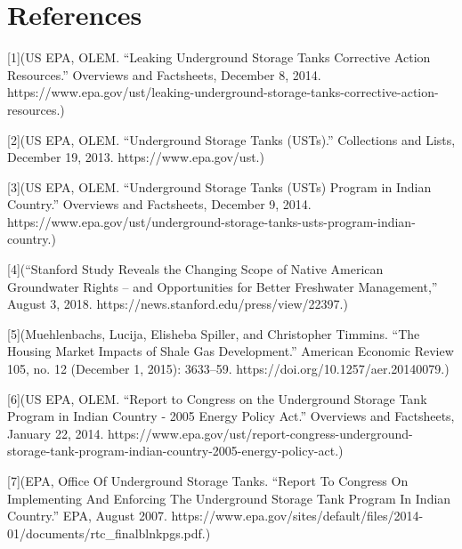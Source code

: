 \documentclass[12pt]{article}
\begin{document}
\newpage
\section{References}




[1](US EPA, OLEM. “Leaking Underground Storage Tanks Corrective Action Resources.” Overviews and Factsheets, December 8, 2014. https://www.epa.gov/ust/leaking-underground-storage-tanks-corrective-action-resources.)

[2](US EPA, OLEM. “Underground Storage Tanks (USTs).” Collections and Lists, December 19, 2013. https://www.epa.gov/ust.)

[3](US EPA, OLEM. “Underground Storage Tanks (USTs) Program in Indian Country.” Overviews and Factsheets, December 9, 2014. https://www.epa.gov/ust/underground-storage-tanks-usts-program-indian-country.)

[4](“Stanford Study Reveals the Changing Scope of Native American Groundwater Rights – and Opportunities for Better Freshwater Management,” August 3, 2018. https://news.stanford.edu/press/view/22397.)

[5](Muehlenbachs, Lucija, Elisheba Spiller, and Christopher Timmins. “The Housing Market Impacts of Shale Gas Development.” American Economic Review 105, no. 12 (December 1, 2015): 3633–59. https://doi.org/10.1257/aer.20140079.)

[6](US EPA, OLEM. “Report to Congress on the Underground Storage Tank Program in Indian Country - 2005 Energy Policy Act.” Overviews and Factsheets, January 22, 2014. https://www.epa.gov/ust/report-congress-underground-storage-tank-program-indian-country-2005-energy-policy-act.)

[7](EPA, Office Of Underground Storage Tanks. “Report To Congress On Implementing And Enforcing The Underground Storage Tank Program In Indian Country.” EPA, August 2007. https://www.epa.gov/sites/default/files/2014-01/documents/rtc\_finalblnkpgs.pdf.)

\newpage
\end{document}

